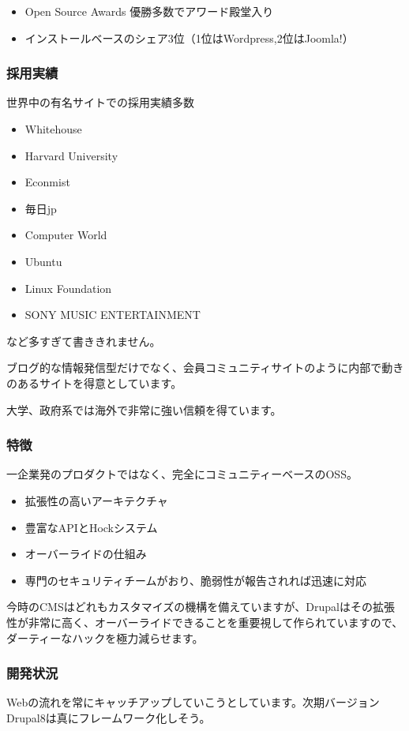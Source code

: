 \documentclass[mingoth,a4paper]{jsarticle}
\begin{document}
\begin{itemize}
\item Open Source Awards 優勝多数でアワード殿堂入り
\item インストールベースのシェア3位（1位はWordpress,2位はJoomla!）
\end{itemize}

\subsubsection{採用実績}
世界中の有名サイトでの採用実績多数
\begin{itemize}
\item Whitehouse
\item Harvard University
\item Econmist
\item 毎日jp
\item Computer World
\item Ubuntu
\item Linux Foundation
\item SONY MUSIC ENTERTAINMENT
\end{itemize}

など多すぎて書ききれません。

ブログ的な情報発信型だけでなく、会員コミュニティサイトのように内部で動きのあるサイトを得意としています。

大学、政府系では海外で非常に強い信頼を得ています。

\subsubsection{特徴}
一企業発のプロダクトではなく、完全にコミュニティーベースのOSS。

\begin{itemize}
\item 拡張性の高いアーキテクチャ
\item 豊富なAPIとHockシステム
\item オーバーライドの仕組み
\item 専門のセキュリティチームがおり、脆弱性が報告されれば迅速に対応
\end{itemize}

今時のCMSはどれもカスタマイズの機構を備えていますが、Drupalはその拡張性が非常に高く、オーバーライドできることを重要視して作られていますので、ダーティーなハックを極力減らせます。

\subsubsection{開発状況}
Webの流れを常にキャッチアップしていこうとしています。次期バージョンDrupal8は真にフレームワーク化しそう。
\end{document}
